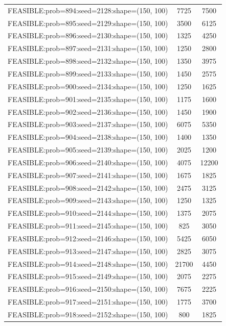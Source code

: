\begin{longtable}{lcc}
FEASIBLE:prob=894:seed=2128:shape=(150, 100) &     7725 &  7500 \\
FEASIBLE:prob=895:seed=2129:shape=(150, 100) &     3500 &  6125 \\
FEASIBLE:prob=896:seed=2130:shape=(150, 100) &     1325 &  4250 \\
FEASIBLE:prob=897:seed=2131:shape=(150, 100) &     1250 &  2800 \\
FEASIBLE:prob=898:seed=2132:shape=(150, 100) &     1350 &  3975 \\
FEASIBLE:prob=899:seed=2133:shape=(150, 100) &     1450 &  2575 \\
FEASIBLE:prob=900:seed=2134:shape=(150, 100) &     1250 &  1625 \\
FEASIBLE:prob=901:seed=2135:shape=(150, 100) &     1175 &  1600 \\
FEASIBLE:prob=902:seed=2136:shape=(150, 100) &     1450 &  1900 \\
FEASIBLE:prob=903:seed=2137:shape=(150, 100) &     6075 &  5350 \\
FEASIBLE:prob=904:seed=2138:shape=(150, 100) &     1400 &  1350 \\
FEASIBLE:prob=905:seed=2139:shape=(150, 100) &     2025 &  1200 \\
FEASIBLE:prob=906:seed=2140:shape=(150, 100) &     4075 & 12200 \\
FEASIBLE:prob=907:seed=2141:shape=(150, 100) &     1675 &  1825 \\
FEASIBLE:prob=908:seed=2142:shape=(150, 100) &     2475 &  3125 \\
FEASIBLE:prob=909:seed=2143:shape=(150, 100) &     1250 &  1325 \\
FEASIBLE:prob=910:seed=2144:shape=(150, 100) &     1375 &  2075 \\
FEASIBLE:prob=911:seed=2145:shape=(150, 100) &      825 &  3050 \\
FEASIBLE:prob=912:seed=2146:shape=(150, 100) &     5425 &  6050 \\
FEASIBLE:prob=913:seed=2147:shape=(150, 100) &     2825 &  3075 \\
FEASIBLE:prob=914:seed=2148:shape=(150, 100) &    21700 &  4450 \\
FEASIBLE:prob=915:seed=2149:shape=(150, 100) &     2075 &  2275 \\
FEASIBLE:prob=916:seed=2150:shape=(150, 100) &     7675 &  2225 \\
FEASIBLE:prob=917:seed=2151:shape=(150, 100) &     1775 &  3700 \\
FEASIBLE:prob=918:seed=2152:shape=(150, 100) &      800 &  1825 \\

\end{longtable}
